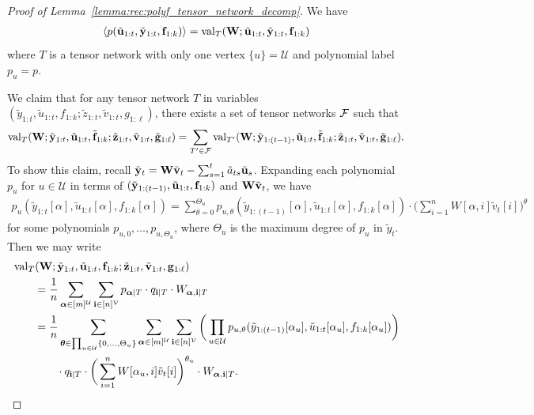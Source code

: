 \documentclass[10pt,reqno]{amsart}
\def\cU{\mathcal{U}}
\def\cV{\mathcal{V}}
\def\val{\operatorname{val}}
\def\bW{{\mathbf{W}}}
\def\bi{\mathbf{i}}
\def\bu{{\mathbf{u}}}
\def\bz{{\mathbf{z}}}
\def\bff{{\mathbf{f}}}
\begin{document}
\begin{proof}[Proof of Lemma~\ref{lemma:rec:polyf_tensor_network_decomp}]
We have
\begin{align*}
\langle p(\tilde \bu_{1:t},\tilde \by_{1:t}, \bff_{1:k}) \rangle 
=\val_{T}(\bW;\tilde \bu_{1:t},\tilde \by_{1:t},\bff_{1:k})
\end{align*}
where $T$ is a tensor network with only one vertex $\{u\} = \mathcal{U}$
and polynomial label $p_u = p$. 

We claim that for any tensor network $T$ in variables
$(\tilde y_{1:t},\tilde u_{1:{t}},f_{1:k};\tilde z_{1:t},\tilde v_{1:t},
g_{1:\ell})$, there exists a set of tensor networks $\mathcal{F}$ such that
\begin{align}\label{eq:rec:reducey}
\val_{T}(\bW;\tilde\by_{1:t},\tilde\bu_{1:t},\tilde\bff_{1:k};
\tilde\bz_{1:t},\tilde\bv_{1:t},\tilde\bg_{1:\ell})
= \sum_{T'\in\cF}
\val_{T'}(\bW;\tilde\by_{1:(t-1)},\tilde\bu_{1:{t}},\tilde\bff_{1:k};
\tilde\bz_{1:t},\tilde\bv_{1:t},\tilde\bg_{1:\ell}).
\end{align}
To show this claim, recall $\tilde\by_t = \bW \tilde\bv_t - \sum_{s=1}^t \tilde a_{ts}
\tilde\bu_s$. Expanding each polynomial $p_u$ for $u \in \cU$
in terms of $(\tilde\by_{1:(t-1)},\tilde\bu_{1:t}, \bff_{1:k})$ and 
$\bW\tilde\bv_t$, we have 
\begin{align*}
p_u(\tilde y_{1:t}[\alpha],\tilde u_{1:t}[\alpha], f_{1:k}[\alpha]) 
= \sum_{\theta=0}^{\Theta_u} p_{u,\theta}(\tilde y_{1:(t-1)}[\alpha], 
\tilde u_{1:t}[\alpha], f_{1:k}[\alpha]) \cdot
\bigg(\sum_{i=1}^n W[\alpha,i] \tilde v_t[i]\bigg)^\theta
\end{align*}
for some polynomials $p_{u,0},\ldots,p_{u,\Theta_u}$, where $\Theta_u$ is the 
maximum degree of $p_u$ in $\tilde y_t$. Then we may write
\begin{align*}
&\val_{T}(\bW;\tilde \by_{1:t},\tilde \bu_{1:{t}},\bff_{1:k};\tilde
\bz_{1:t},\tilde \bv_{1:t},\bg_{1:\ell})\\
&\qquad = \frac{1}{n} \sum_{\balpha\in[m]^\cU} \sum_{\bi\in[n]^\cV} 
p_{\balpha|T} \cdot q_{\ib|T} \cdot W_{\balpha,\ib|T}\\
&\qquad =  \frac{1}{n} \sum_{\btheta \in \prod_{u \in \cU} \{0,\ldots,\Theta_u\}}
\sum_{\balpha\in[m]^{\cU}} \sum_{\bi\in[n]^{\cV}} 
\bigg(\prod_{u\in\cU} p_{u,\theta}(\tilde y_{1:(t-1)}[\alpha_u],
\tilde u_{1:t}[\alpha_u],f_{1:k}[\alpha_u])\bigg)\\
&\qquad\qquad \cdot q_{\bi|T} \cdot
\bigg(\sum_{i=1}^n W[\alpha_u,i] \tilde v_t[i]\bigg)^{\theta_u}
\cdot W_{{\balpha},\bi|T}.

\end{align*}
\end{proof}
\end{document}
